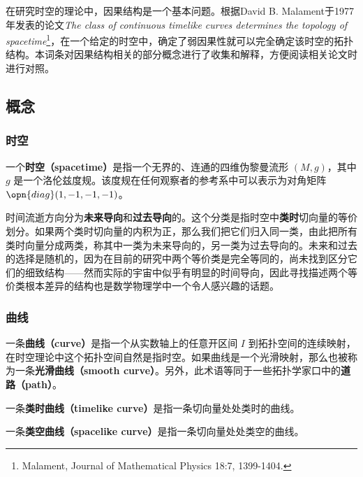 



在研究时空的理论中，因果结构是一个基本问题。根据David B. Malament于1977年发表的论文\textsl{The class of continuous timelike curves determines the topology of spacetime}\footnote{Malament, Journal of Mathematical Physics 18:7, 1399-1404. }，在一个给定的时空中，确定了弱因果性就可以完全确定该时空的拓扑结构。本词条对因果结构相关的部分概念进行了收集和解释，方便阅读相关论文时进行对照。

\subsection{概念}

\subsubsection{时空}

一个\textbf{时空（spacetime）}是指一个无界的、连通的四维伪黎曼流形 $(M, g)$，其中 $g$ 是一个洛伦兹度规。该度规在任何观察者的参考系中可以表示为对角矩阵 $\opn{diag}(1, -1, -1, -1)$。

时间流逝方向分为\textbf{未来导向}和\textbf{过去导向}的。这个分类是指时空中\textbf{类时}切向量的等价划分。如果两个类时切向量的内积为正，那么我们把它们归入同一类，由此把所有类时向量分成两类，称其中一类为未来导向的，另一类为过去导向的。未来和过去的选择是随机的，因为在目前的研究中两个等价类是完全等同的，尚未找到区分它们的细致结构——然而实际的宇宙中似乎有明显的时间导向，因此寻找描述两个等价类根本差异的结构也是数学物理学中一个令人感兴趣的话题。

\subsubsection{曲线}

一条\textbf{曲线（curve）}是指一个从实数轴上的任意开区间 $I$ 到拓扑空间的连续映射，在时空理论中这个拓扑空间自然是指时空。如果曲线是一个光滑映射，那么也被称为一条\textbf{光滑曲线（smooth curve）}。另外，此术语等同于一些拓扑学家口中的\textbf{道路（path）}。

一条\textbf{类时曲线（timelike curve）}是指一条切向量处处类时的曲线。

一条\textbf{类空曲线（spacelike curve）}是指一条切向量处处类空的曲线。

